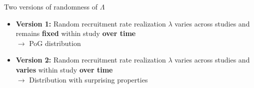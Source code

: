 \documentclass[english]{beamer}\usepackage[]{graphicx}\usepackage[]{xcolor}
\begin{document}
% 





\begin{frame}{Two versions of randomness of $\Lambda$}
\begin{itemize}
\item \textbf{Version 1:} Random recruitment rate realization $\lambda$ varies across studies and remains \textbf{fixed} within study \textbf{over time} \\ $\rightarrow$ PoG distribution
\item \textbf{Version 2:} Random recruitment rate realization $\lambda$ varies across studies and \textbf{varies} within study \textbf{over time} \\ $\rightarrow$ Distribution with surprising properties
\end{itemize}
\end{frame}
\end{document}
